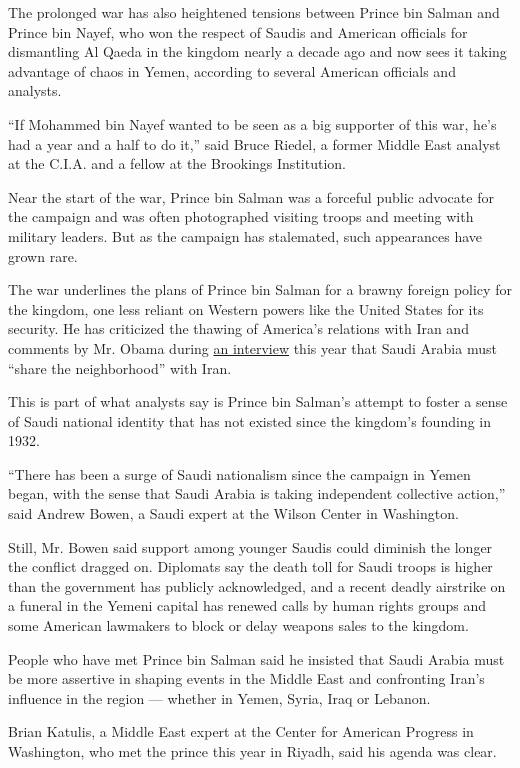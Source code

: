 The prolonged war has also heightened tensions between Prince bin Salman
and Prince bin Nayef, who won the respect of Saudis and American
officials for dismantling Al Qaeda in the kingdom nearly a decade ago
and now sees it taking advantage of chaos in Yemen, according to several
American officials and analysts.

``If Mohammed bin Nayef wanted to be seen as a big supporter of this
war, he's had a year and a half to do it,'' said Bruce Riedel, a former
Middle East analyst at the C.I.A. and a fellow at the Brookings
Institution.

Near the start of the war, Prince bin Salman was a forceful public
advocate for the campaign and was often photographed visiting troops and
meeting with military leaders. But as the campaign has stalemated, such
appearances have grown rare.

The war underlines the plans of Prince bin Salman for a brawny foreign
policy for the kingdom, one less reliant on Western powers like the
United States for its security. He has criticized the thawing of
America's relations with Iran and comments by Mr. Obama during
\href{http://www.theatlantic.com/magazine/archive/2016/04/the-obama-doctrine/471525/}{an
interview} this year that Saudi Arabia must ``share the neighborhood''
with Iran.

This is part of what analysts say is Prince bin Salman's attempt to
foster a sense of Saudi national identity that has not existed since the
kingdom's founding in 1932.

``There has been a surge of Saudi nationalism since the campaign in
Yemen began, with the sense that Saudi Arabia is taking independent
collective action,'' said Andrew Bowen, a Saudi expert at the Wilson
Center in Washington.

Still, Mr. Bowen said support among younger Saudis could diminish the
longer the conflict dragged on. Diplomats say the death toll for Saudi
troops is higher than the government has publicly acknowledged, and a
recent deadly airstrike on a funeral in the Yemeni capital has renewed
calls by human rights groups and some American lawmakers to block or
delay weapons sales to the kingdom.

People who have met Prince bin Salman said he insisted that Saudi Arabia
must be more assertive in shaping events in the Middle East and
confronting Iran's influence in the region --- whether in Yemen, Syria,
Iraq or Lebanon.

Brian Katulis, a Middle East expert at the Center for American Progress
in Washington, who met the prince this year in Riyadh, said his agenda
was clear.

